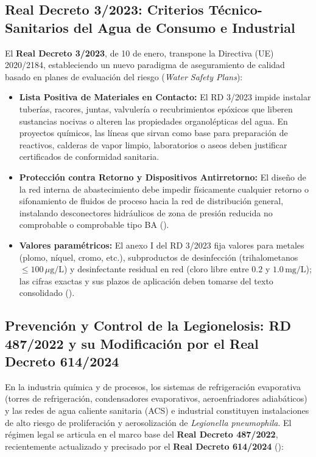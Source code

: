 \documentclass{report}
\begin{document}
\subsection{Real Decreto 3/2023: Criterios Técnico-Sanitarios del Agua de Consumo e Industrial}
El \textbf{Real Decreto 3/2023}, de 10 de enero, transpone la Directiva (UE) 2020/2184, estableciendo un nuevo paradigma de aseguramiento de calidad basado en planes de evaluación del riesgo (\textit{Water Safety Plans}):
\begin{itemize}
    \item \textbf{Lista Positiva de Materiales en Contacto:} El RD 3/2023 impide instalar tuberías, racores, juntas, valvulería o recubrimientos epóxicos que liberen sustancias nocivas o alteren las propiedades organolépticas del agua. En proyectos químicos, las líneas que sirvan como base para preparación de reactivos, calderas de vapor limpio, laboratorios o aseos deben justificar certificados de conformidad sanitaria.
    \item \textbf{Protección contra Retorno y Dispositivos Antirretorno:} El diseño de la red interna de abastecimiento debe impedir físicamente cualquier retorno o sifonamiento de fluidos de proceso hacia la red de distribución general, instalando desconectores hidráulicos de zona de presión reducida no comprobable o comprobable tipo BA (\cite{CTE_DB_HS4}).
    \item \textbf{Valores paramétricos:} El anexo I del RD 3/2023 fija valores para metales (plomo, níquel, cromo, etc.), subproductos de desinfección (trihalometanos $\le 100\,\mu\text{g/L}$) y desinfectante residual en red (cloro libre entre $0.2$ y $1.0\,\text{mg/L}$); las cifras exactas y sus plazos de aplicación deben tomarse del texto consolidado (\cite{RD3_2023}).
\end{itemize}

\subsection{Prevención y Control de la Legionelosis: RD 487/2022 y su Modificación por el Real Decreto 614/2024}
En la industria química y de procesos, los sistemas de refrigeración evaporativa (torres de refrigeración, condensadores evaporativos, aeroenfriadores adiabáticos) y las redes de agua caliente sanitaria (ACS) e industrial constituyen instalaciones de alto riesgo de proliferación y aerosolización de \textit{Legionella pneumophila}. El régimen legal se articula en el marco base del \textbf{Real Decreto 487/2022}, recientemente actualizado y precisado por el \textbf{Real Decreto 614/2024} (\cite{RD487_2022, RD614_2024}):
\end{document}
